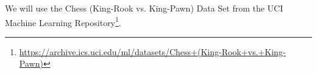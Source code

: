 We will use the Chess (King-Rook vs. King-Pawn) Data Set from the UCI Machine
Learning Repository\footnote{
\url{https://archive.ics.uci.edu/ml/datasets/Chess+(King-Rook+vs.+King-Pawn)}
}.
